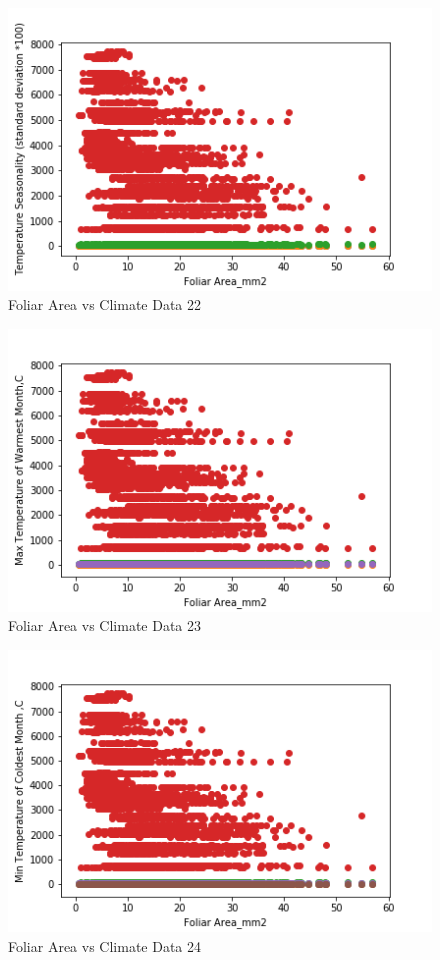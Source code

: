 \documentclass[letterpaper]{article}
\begin{document}
\begin{figure}[h]
\caption{Foliar Area vs Climate Data 22\label{fig:Foliar_Area_vs_22}}
\centering
\includegraphics[width=0.7\paperwidth]{Foliar_Area_vs_22}
\end{figure}


\begin{figure}[h]
\caption{Foliar Area vs Climate Data 23\label{fig:Foliar_Area_vs_23}}
\centering
\includegraphics[width=0.7\paperwidth]{Foliar_Area_vs_23}
\end{figure}


\begin{figure}[h]
\caption{Foliar Area vs Climate Data 24\label{fig:Foliar_Area_vs_24}}
\centering
\includegraphics[width=0.7\paperwidth]{Foliar_Area_vs_24}
\end{figure}
\end{document}
